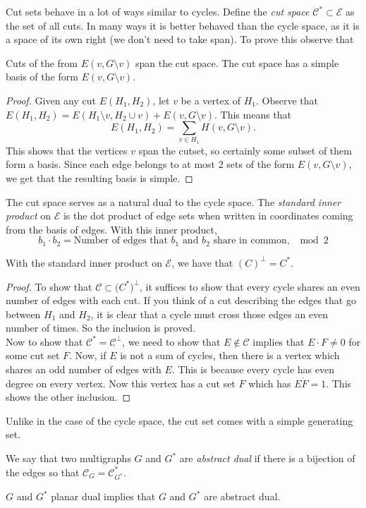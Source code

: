 Cut sets behave in a lot of ways similar to cycles. Define the \emph{  cut space} $\mathcal C^*\subset \mathcal E$ as the set of all cuts. In many ways it is better behaved than the cycle space, as it is a space of its own right (we don't need to take span). To prove this observe that 
\begin{claim}
 Cuts of the from $E(v, G\setminus v)$ span the cut space.  The cut space has a simple basis of the form $E(v, G\setminus v).$
\end{claim}
\begin{proof}
 Given any cut $E(H_1, H_2)$, let $v$ be a vertex of $H_1$. Observe that $ E(H_1, H_2)=E(H_1\setminus v, H_2\cup v)+E(v, G\setminus v)$. This means that 
 \[E(H_1, H_2)=\sum_{v\in H_1} H(v, G\setminus v). \]
 This shows that the vertices $v$ span the cutset, so certainly some subset of them form a basis. Since each edge belongs to at most 2 sets of the form $E(v, G\setminus v)$, we get that the resulting basis is simple. 
\end{proof}
The cut space serves as a natural dual to the cycle space. The \emph{standard inner product} on $\mathcal E$ is the dot product of edge sets when written in coordinates coming from the basis of edges.  With this inner product, 
\[b_1\cdot b_2=\text{Number of edges that $b_1$ and $b_2$ share in common, $\mod 2$}\]
\begin{claim}
 With the standard inner product on $\mathcal E$, we have that $(C)^\bot=C^*$.
\end{claim}
\begin{proof}
 To show that $\mathcal C\subset \mathcal( C^*)^\bot$, it suffices to show that every cycle shares an even number of edges with each cut. If you think of a cut describing the edges that go between $H_1$ and $H_2$, it is clear that a cycle must cross those edges an even number of times. So the inclusion is proved. \\
 Now to show that $\mathcal C^*=\mathcal C^\bot$, we need to show that $E\not \in \mathcal C$ implies that $E\cdot F\neq 0$ for some cut set $F$. Now, if $E$ is not a sum of cycles, then there is a vertex which shares an odd number of edges with $E$. This is because every cycle has even degree on every vertex. Now this vertex has a cut set $F$ which has $E\dot F=1$. This shows the other inclusion. 
\end{proof}
Unlike in the case of the cycle space, the cut set comes with a simple generating set. 


\begin{definition}
 We say that two multigraphs $G$ and $G^*$ are \emph{abstract dual} if there is a bijection of the edges so that $\mathcal C_G=\mathcal C_{G^*}^*$. 
\end{definition}
\begin{claim}
 $G$ and $G^*$ planar dual implies that $G$ and $G^*$ are abstract dual. 
\end{claim}

